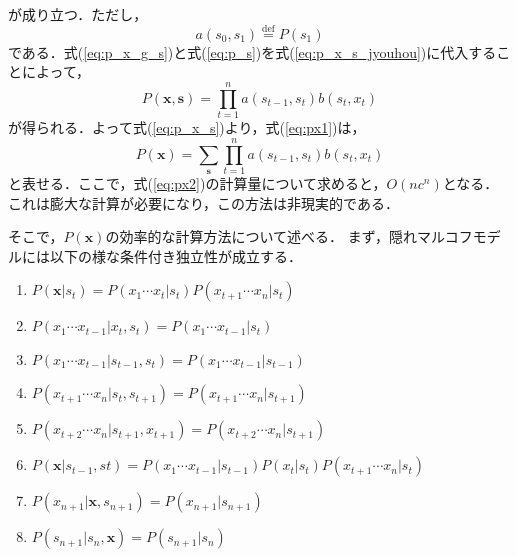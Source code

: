 \documentclass[a4j]{jarticle}
\begin{document}
が成り立つ．ただし，
\begin{equation}
a(s_{0}, s_{1}) \overset{\mathrm{def}}{=} P(s_{1})
\end{equation}
である．式(\ref{eq:p_x_g_s})と式(\ref{eq:p_s})を式(\ref{eq:p_x_s_jyouhou})に代入することによって，
\begin{equation}
P(\mathbf{x}, \mathbf{s}) = \prod_{t=1}^{n} a(s_{t-1}, s_{t}) b(s_{t}, x_{t}) \label{eq:p_x_s}
\end{equation}
が得られる．よって式(\ref{eq:p_x_s})より，式(\ref{eq:px1})は，
\begin{equation}
  P(\mathbf{x}) = \sum_{\mathbf{s}} \prod_{t=1}^{n} a(s_{t-1}, s_{t}) b(s_{t}, x_{t}) \label{eq:px2}
\end{equation}
と表せる．ここで，式(\ref{eq:px2})の計算量について求めると，$O(nc^{n})$となる．これは膨大な計算が必要になり，この方法は非現実的である．

そこで，$P(\mathbf{x})$の効率的な計算方法について述べる．
まず，隠れマルコフモデルには以下の様な条件付き独立性が成立する\cite{PRLM_ge}．

\begin{mdframed}[topline = false, bottomline = false, rightline = false, innerlinewidth = 2pt, frametitle = 隠れマルコフモデルの条件付き独立性]
	\begin{enumerate}[label=(\arabic*)]
		\item $P(\mathbf{x} | s_{t}) = P(x_{1} \cdots x_{t} | s_{t}) P(x_{t+1} \cdots x_{n} | s_{t})$
    \item $P(x_{1} \cdots x_{t-1} | x_{t}, s_{t}) = P(x_{1} \cdots x_{t-1} | s_{t})$
    \item $P(x_{1} \cdots x_{t-1} | s_{t-1}, s_{t}) = P(x_{1} \cdots x_{t-1} | s_{t-1})$
    \item $P(x_{t+1} \cdots x_{n} | s_{t}, s_{t+1}) = P(x_{t+1} \cdots x_{n} | s_{t+1})$
    \item $P(x_{t+2} \cdots x_{n} | s_{t+1}, x_{t+1}) = P(x_{t+2} \cdots x_{n} | s_{t+1})$
    \item $P(\mathbf{x} | s_{t-1}, s{t}) = P(x_{1} \cdots x_{t-1} | s_{t-1}) P(x_{t} | s_{t}) P(x_{t+1} \cdots x_{n} | s_{t})$
    \item $P(x_{n+1} | \mathbf{x}, s_{n+1}) = P(x_{n+1} | s_{n+1})$
    \item $P(s_{n+1} | s_{n}, \mathbf{x}) = P(s_{n+1} | s_{n}) $
	\end{enumerate}
\end{mdframed}
\end{document}
